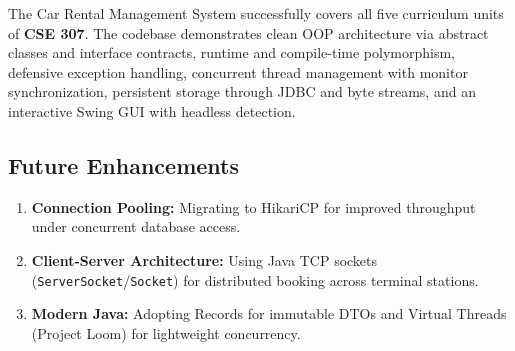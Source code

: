 \documentclass[11pt,a4paper]{article}
\begin{document}
The Car Rental Management System successfully covers all five curriculum units of \textbf{CSE 307}. The codebase demonstrates clean OOP architecture via abstract classes and interface contracts, runtime and compile-time polymorphism, defensive exception handling, concurrent thread management with monitor synchronization, persistent storage through JDBC and byte streams, and an interactive Swing GUI with headless detection.

\subsection{Future Enhancements}
\begin{enumerate}
    \item \textbf{Connection Pooling:} Migrating to HikariCP for improved throughput under concurrent database access.
    \item \textbf{Client-Server Architecture:} Using Java TCP sockets (\texttt{ServerSocket}/\texttt{Socket}) for distributed booking across terminal stations.
    \item \textbf{Modern Java:} Adopting Records for immutable DTOs and Virtual Threads (Project Loom) for lightweight concurrency.
\end{enumerate}


\newpage
\appendix
\end{document}
